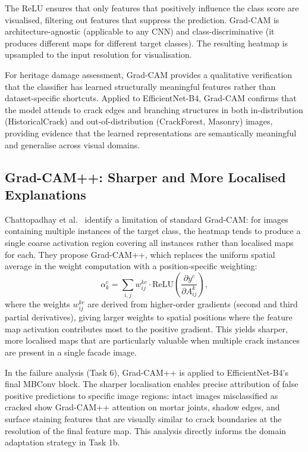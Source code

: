 \documentclass[12pt,a4paper]{article}
\begin{document}
The ReLU ensures that only features that positively influence the class score are visualised, filtering out features that suppress the prediction. Grad-CAM is architecture-agnostic (applicable to any CNN) and class-discriminative (it produces different maps for different target classes). The resulting heatmap is upsampled to the input resolution for visualisation.

For heritage damage assessment, Grad-CAM provides a qualitative verification that the classifier has learned structurally meaningful features rather than dataset-specific shortcuts. Applied to EfficientNet-B4, Grad-CAM confirms that the model attends to crack edges and branching structures in both in-distribution (HistoricalCrack) and out-of-distribution (CrackForest, Masonry) images, providing evidence that the learned representations are semantically meaningful and generalise across visual domains.

\subsection{Grad-CAM++: Sharper and More Localised Explanations}

Chattopadhay et al.~\cite{chattopadhay2018gradcampp} identify a limitation of standard Grad-CAM: for images containing multiple instances of the target class, the heatmap tends to produce a single coarse activation region covering all instances rather than localised maps for each. They propose Grad-CAM++, which replaces the uniform spatial average in the weight computation with a position-specific weighting:
\begin{equation}
  \alpha_k^c = \sum_{i,j} w^{kc}_{ij} \cdot \text{ReLU}\!\left(\frac{\partial y^c}{\partial A^k_{ij}}\right),
\end{equation}
where the weights $w^{kc}_{ij}$ are derived from higher-order gradients (second and third partial derivatives), giving larger weights to spatial positions where the feature map activation contributes most to the positive gradient. This yields sharper, more localised maps that are particularly valuable when multiple crack instances are present in a single facade image.

In the failure analysis (Task 6), Grad-CAM++ is applied to EfficientNet-B4's final MBConv block. The sharper localisation enables precise attribution of false positive predictions to specific image regions: intact images misclassified as cracked show Grad-CAM++ attention on mortar joints, shadow edges, and surface staining features that are visually similar to crack boundaries at the resolution of the final feature map. This analysis directly informs the domain adaptation strategy in Task 1b.
\end{document}
